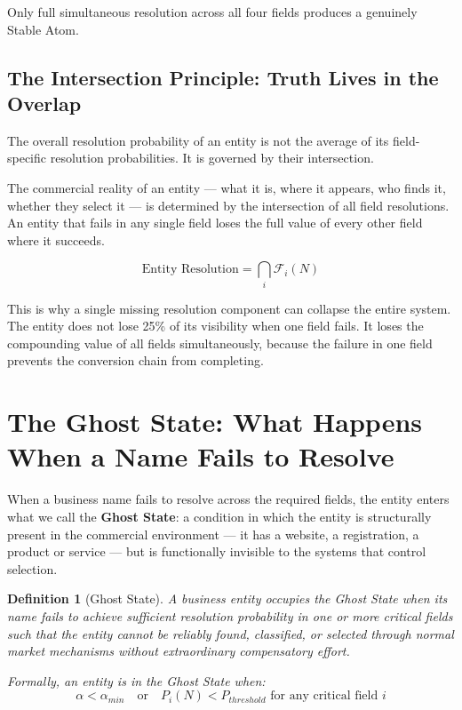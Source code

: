 \documentclass[12pt, openany]{book}
\theoremstyle{thmstyle}
\theoremstyle{defstyle}
\newtheorem{definition}{Definition}[chapter]
\begin{document}
Only full simultaneous resolution across all four fields produces a genuinely Stable Atom.

\subsection{The Intersection Principle: Truth Lives in the Overlap}

The overall resolution probability of an entity is not the average of its field-specific resolution probabilities. It is governed by their intersection.

\begin{keybox}
The commercial reality of an entity --- what it is, where it appears, who finds it, whether they select it --- is determined by the intersection of all field resolutions. An entity that fails in any single field loses the full value of every other field where it succeeds.

\[
\text{Entity Resolution} = \bigcap_{i} \mathcal{F}_i(N)
\]
\end{keybox}

This is why a single missing resolution component can collapse the entire system. The entity does not lose 25\% of its visibility when one field fails. It loses the compounding value of all fields simultaneously, because the failure in one field prevents the conversion chain from completing.

\section{The Ghost State: What Happens When a Name Fails to Resolve}

When a business name fails to resolve across the required fields, the entity enters what we call the \textbf{Ghost State}: a condition in which the entity is structurally present in the commercial environment --- it has a website, a registration, a product or service --- but is functionally invisible to the systems that control selection.

\begin{definition}[Ghost State]
A business entity occupies the Ghost State when its name fails to achieve sufficient resolution probability in one or more critical fields such that the entity cannot be reliably found, classified, or selected through normal market mechanisms without extraordinary compensatory effort.

Formally, an entity is in the Ghost State when:
\[
\alpha < \alpha_{min} \quad \text{or} \quad P_i(N) < P_{threshold} \text{ for any critical field } i
\]
\end{definition}
\end{document}
